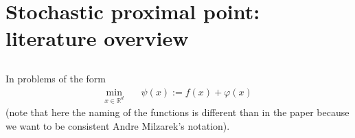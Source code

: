 \documentclass[12pt,a4paper,twoside]{article}
\makeatletter
\renewcommand*{\eqref}[1]{%
	\hyperref[{#1}]{\textup{\tagform@{\ref*{#1}}}}%
}
\theoremstyle{plain}
\theoremstyle{note}
\numberwithin{thm}{section}
\newcommand{\prox}[2]{\text{Prox}_{#1}\left(#2\right)}
\newcommand{\oneover}[1]{\frac{1}{#1}}
\newcommand{\ixmap}[1]{{\kappa(#1)}}
\let\temp\phi
\let\phi\varphi
\let\varphi\temp
\makeatother
\begin{document}
%	
%	
%	
%	
%




\clearpage
	\section{Stochastic proximal point: literature overview}
	\subsection{\cite{Davis2019}}
	In \cite{Davis2019} problems of the form
	\begin{align*}
		\min_{x \in \mathbb{R}^d}\quad &{\psi(x) := f(x) + \phi(x)}
	\end{align*}
	(note that here the naming of the functions is different than in the paper because we want to be consistent Andre Milzarek's notation).
	
\end{document}
